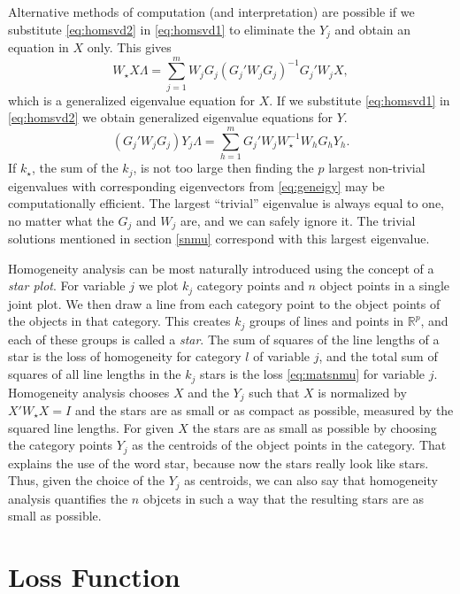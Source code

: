 \documentclass[
  12pt,
]{article}
\begin{document}
Alternative methods of computation (and interpretation) are possible if we
substitute \eqref{eq:homsvd2} in \eqref{eq:homsvd1} to eliminate the \(Y_j\)
and obtain an equation in \(X\) only. This gives
\begin{equation}
W_\star X\Lambda=\sum_{j=1}^m W_jG_j(G_j'W_jG_j)^{-1}G_j'W_jX,
\label{eq:geneigx}
\end{equation}
which is a generalized eigenvalue equation for \(X\). If we substitute \eqref{eq:homsvd1}
in \eqref{eq:homsvd2} we obtain generalized eigenvalue equations for \(Y\).
\begin{equation}
(G_j'W_jG_j)Y_j\Lambda=\sum_{h=1}^m G_j'W_jW_\star^{-1}W_hG_hY_h.
\label{eq:geneigy}
\end{equation}
If \(k_\star\), the sum of the \(k_j\), is not too large then finding the \(p\) largest non-trivial eigenvalues with corresponding eigenvectors from \eqref{eq:geneigy} may be computationally efficient. The largest ``trivial'' eigenvalue is always equal to one, no matter what the \(G_j\) and \(W_j\) are, and we can safely ignore it. The trivial solutions mentioned in section \ref{snmu} correspond with this largest eigenvalue.

Homogeneity analysis can be most naturally introduced using the concept of a \emph{star plot}. For variable \(j\) we plot \(k_j\) category points and \(n\) object
points in a single joint plot. We then draw a line from each category point to the object points of the objects in that category. This creates \(k_j\) groups of
lines and points in \(\mathbb{R}^p\), and each of these groups is called a \emph{star}.
The sum of squares of the line lengths of a star is the loss of homogeneity for category \(l\) of variable \(j\), and the total sum of squares of all line lengths in the \(k_j\) stars is the loss \eqref{eq:matsnmu} for variable \(j\). Homogeneity analysis chooses \(X\) and the \(Y_j\) such that \(X\) is normalized by \(X'W_\star X=I\) and the stars are as small or as compact as possible, measured by the squared line lengths. For given \(X\) the stars are as small as possible by choosing the category points \(Y_j\) as the centroids of the object points in the category. That explains the use of the word star, because now the stars really look like stars. Thus, given the choice of the \(Y_j\) as centroids, we can also say that homogeneity analysis quantifies the \(n\) objcets in such a way that the resulting stars are as small as possible.

\section{Loss Function}\label{loss-function}
\end{document}
